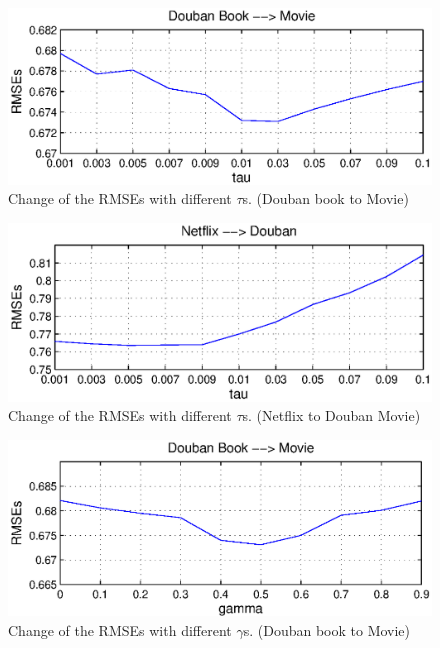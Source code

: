 \begin{figure}[t]
\centering
\includegraphics[width=6.5in]{fig/douban_tau.eps}
\caption{Change of the RMSEs with different $\tau$s. (Douban book to Movie)}\label{fig:tau1}
\end{figure}


\begin{figure}[t]
\centering
\includegraphics[width=6.5in]{fig/nf_tau.eps}
\caption{Change of the RMSEs with different $\tau$s. (Netflix to Douban Movie)}\label{fig:tau2}
\end{figure}


\begin{figure}[t]
\centering
\includegraphics[width=6.5in]{fig/douban_gamma.eps}
\caption{Change of the RMSEs with different $\gamma$s. (Douban book to Movie)}\label{fig:gamma1}
\end{figure}



